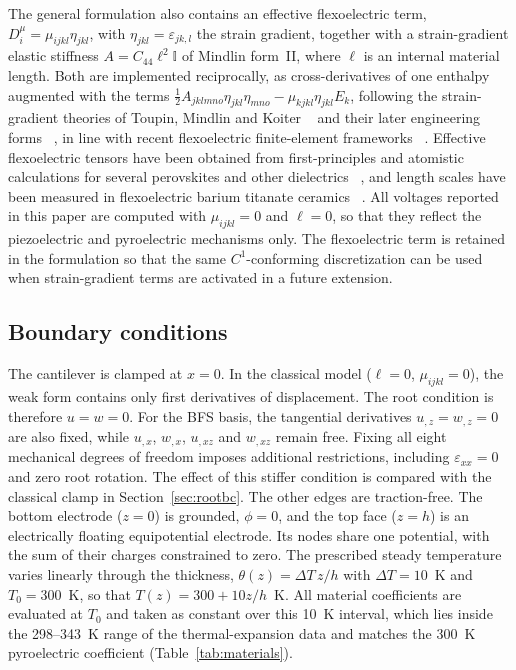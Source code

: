 \documentclass[a4paper,12pt]{elsarticle}
\begin{document}
The general formulation also contains an effective flexoelectric term,
$D_i^\mu=\mu_{ijkl}\eta_{jkl}$, with $\eta_{jkl}=\varepsilon_{jk,l}$ the strain
gradient, together with a strain-gradient elastic stiffness
$A=C_{44}\ell^2\mathbb{I}$ of Mindlin form~II, where $\ell$ is an internal material
length. Both are implemented reciprocally, as cross-derivatives of one enthalpy
augmented with the terms
$\tfrac12A_{jklmno}\eta_{jkl}\eta_{mno}-\mu_{kjkl}\eta_{jkl}E_k$, following the
strain-gradient theories of Toupin, Mindlin and Koiter
~\cite{Toupin1962,Mindlin1964,MindlinEshel1968} and their later engineering forms
~\cite{FleckHutchinson1997,Lam2003,AskesAifantis2011}, in line with recent flexoelectric
finite-element frameworks
~\cite{Mao2016,MaoPurohit2014,Abdollahi2014}. Effective flexoelectric tensors have
been obtained from first-principles and atomistic calculations for several perovskites
and other dielectrics
~\cite{MarangantiSharma2009,HongVanderbilt2011,Stengel2013}, and length scales have
been measured in flexoelectric barium titanate ceramics
~\cite{MaCross2006,Huang2007}. All voltages reported in this paper are computed with
$\mu_{ijkl}=0$ and $\ell=0$, so that they reflect the piezoelectric and pyroelectric
mechanisms only. The flexoelectric term is retained in the formulation so that the
same $C^1$-conforming discretization can be used when strain-gradient terms are
activated in a future extension.

\subsection{Boundary conditions}
\label{sec:bcs}

The cantilever is clamped at $x=0$. In the classical model
($\ell=0$, $\mu_{ijkl}=0$), the weak form contains only first
derivatives of displacement. The root condition is therefore
$u=w=0$. For the BFS basis, the tangential derivatives
$u_{,z}=w_{,z}=0$ are also fixed, while $u_{,x}$, $w_{,x}$,
$u_{,xz}$ and $w_{,xz}$ remain free. Fixing all eight mechanical
degrees of freedom imposes additional restrictions, including
$\varepsilon_{xx}=0$ and zero root rotation. The effect of this
stiffer condition is compared with the classical clamp in
Section~\ref{sec:rootbc}. The other edges are traction-free.
The bottom electrode ($z=0$) is grounded, $\phi=0$, and the top face
($z=h$) is an electrically floating equipotential electrode. Its nodes
share one potential, with the sum of their charges constrained to zero.
The prescribed steady temperature varies linearly through the thickness,
$\theta(z)=\Delta T\,z/h$ with $\Delta T=10$~K and $T_0=300$~K, so that
$T(z)=300+10z/h$~K. All material coefficients are evaluated at $T_0$ and taken as
constant over this 10~K interval, which lies inside the 298--343~K range of the
thermal-expansion data and matches the 300~K
pyroelectric coefficient (Table~\ref{tab:materials}).
\end{document}
